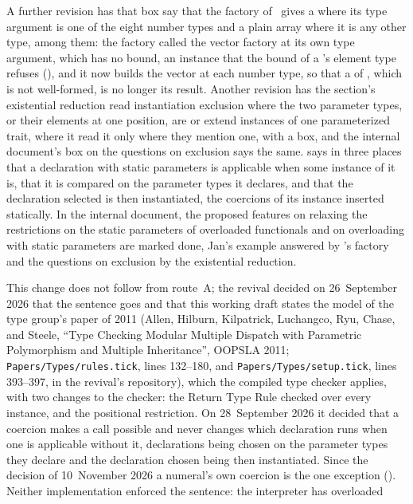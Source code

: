 \begin{description}
A further revision has that box say that the factory of \library\ gives a
 where its type argument is one of the eight number types and a
plain array where it is any other type,  among them: the factory
called the vector factory at its own type argument, which has no bound, an
instance that the bound of a 's element type refuses
(), and it now builds the vector at each number type, so
that a  of , which is not well-formed, is no longer its
result.
Another revision has the section's existential reduction read instantiation
exclusion where the two parameter types, or their elements at one position, are
or extend instances of one parameterized trait, where it read it only where they
mention one, with a box, and the internal document's box on the questions on
exclusion says the same.
 says in three places that a declaration with static
parameters is applicable when some instance of it is, that it is compared on the
parameter types it declares, and that the declaration selected is then
instantiated, the coercions of its instance inserted statically.
In the internal document, the proposed features on relaxing the restrictions on
the static parameters of overloaded functionals and on overloading with static
parameters are marked done, Jan's example answered by \library's factory and the
questions on exclusion by the existential reduction.
\item[Rationale] This change does not follow from route~A; the revival decided
on 26~September 2026 that the sentence goes and that this working draft states
the model of the type group's paper of 2011 (Allen, Hilburn, Kilpatrick,
Luchangco, Ryu, Chase, and Steele, ``Type Checking Modular Multiple Dispatch
with Parametric Polymorphism and Multiple Inheritance'', OOPSLA 2011;
\nolinkurl{Papers/Types/rules.tick}, lines 132--180, and
\nolinkurl{Papers/Types/setup.tick}, lines 393--397, in the revival's
repository), which the compiled type checker applies, with two changes to the
checker: the Return Type Rule checked over every instance, and the positional
restriction.
On 28~September 2026 it decided that a coercion makes a call possible and never
changes which declaration runs when one is applicable without it, declarations
being chosen on the parameter types they declare and the declaration chosen
being then instantiated.
Since the decision of 10~November 2026 a numeral's own coercion is the one
exception ().
Neither implementation enforced the sentence: the interpreter has overloaded

\end{description}
